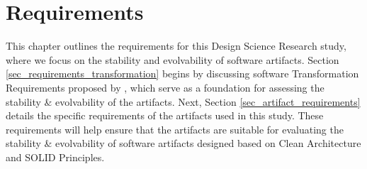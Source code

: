 \chapter{Requirements} \label{chap_requirements} 

This chapter outlines the requirements for this Design Science Research study, where we
focus on the stability and evolvability of software artifacts. Section
\ref{sec_requirements_transformation} begins by discussing software Transformation
Requirements proposed by \textcite{mannaert_normalized_2016}, which serve as a foundation
for assessing the stability \& evolvability of the artifacts. Next, Section
\ref{sec_artifact_requirements} details the specific requirements of the artifacts used in
this study. These requirements will help ensure that the artifacts are suitable for
evaluating the stability \& evolvability of software artifacts designed based on Clean
Architecture and SOLID Principles.




